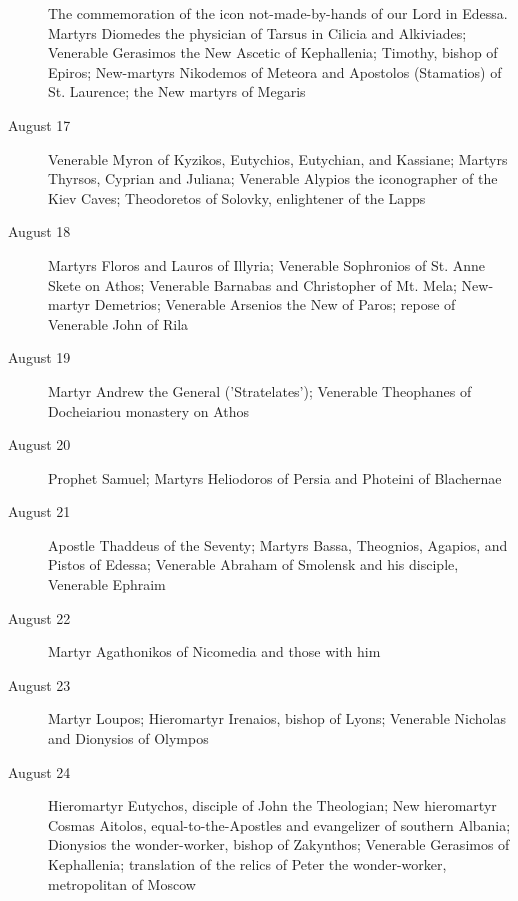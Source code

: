 \begin{description}
The commemoration of the icon not-made-by-hands of our Lord in Edessa. Martyrs Diomedes the physician of Tarsus in Cilicia and Alkiviades; Venerable Gerasimos the New Ascetic of Kephallenia; Timothy, bishop of Epiros; New-martyrs Nikodemos of Meteora and Apostolos (Stamatios) of St. Laurence; the New martyrs of Megaris

\item[August 17]

Venerable Myron of Kyzikos, Eutychios, Eutychian, and Kassiane; Martyrs Thyrsos, Cyprian and Juliana; Venerable Alypios the iconographer of the Kiev Caves; Theodoretos of Solovky, enlightener of the Lapps

\item[August 18]

Martyrs Floros and Lauros of Illyria; Venerable Sophronios of St. Anne Skete on Athos; Venerable Barnabas and Christopher of Mt. Mela; New-martyr Demetrios; Venerable Arsenios the New of Paros; repose of Venerable John of Rila

\item[August 19]

Martyr Andrew the General ('Stratelates'); Venerable Theophanes of Docheiariou monastery on Athos

\item[August 20]

Prophet Samuel; Martyrs Heliodoros of Persia and Photeini of Blachernae

\item[August 21]

Apostle Thaddeus of the Seventy; Martyrs Bassa, Theognios, Agapios, and Pistos of Edessa; Venerable Abraham of Smolensk and his disciple, Venerable Ephraim

\item[August 22]

Martyr Agathonikos of Nicomedia and those with him
\item[August 23]

Martyr Loupos; Hieromartyr Irenaios, bishop of Lyons; Venerable Nicholas and Dionysios of Olympos

\item[August 24]

Hieromartyr Eutychos, disciple of John the Theologian; New hieromartyr Cosmas Aitolos, equal-to-the-Apostles and evangelizer of southern Albania; Dionysios the wonder-worker, bishop of Zakynthos; Venerable Gerasimos of Kephallenia; translation of the relics of Peter the wonder-worker, metropolitan of Moscow


\end{description}
